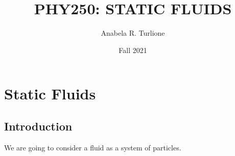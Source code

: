 \documentclass[]{beamer}
\title{PHY250: STATIC FLUIDS}    %
\author{Anabela R. Turlione}                 %
\institute{Digipen}      %
\date{Fall 2021}                    %
\begin{document}
\begin{frame}
  \titlepage
\end{frame}

\section[]{}

\begin{frame}
  \tableofcontents
\end{frame}



\section{Static Fluids}
\subsection{Introduction}

We are going to consider a fluid as a system of particles.

\pause
\end{document}
